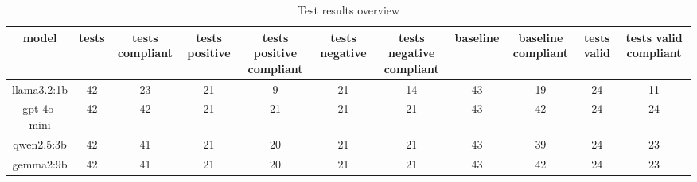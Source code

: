 
  \begin{table}[h!]
  \centering
  \begin{tabular}{|c|c|c|c|c|c|c|c|c|c|c|}
  \hline
  model & tests & tests compliant & tests positive & tests positive compliant & tests negative & tests negative compliant & baseline & baseline compliant & tests valid & tests valid compliant \\
  \hline
  llama3.2:1b & 42 & 23 & 21 & 9 & 21 & 14 & 43 & 19 & 24 & 11\\
\hline
gpt-4o-mini & 42 & 42 & 21 & 21 & 21 & 21 & 43 & 42 & 24 & 24\\
\hline
qwen2.5:3b & 42 & 41 & 21 & 20 & 21 & 21 & 43 & 39 & 24 & 23\\
\hline
gemma2:9b & 42 & 41 & 21 & 20 & 21 & 21 & 43 & 42 & 24 & 23
  \end{tabular}
  \caption{Test results overview}
  
  \end{table}
  